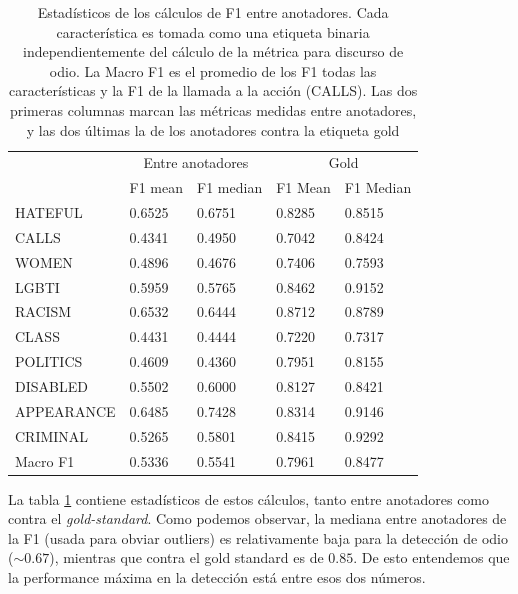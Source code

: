 \begin{table}
    \centering
    \begin{tabular}{lll|ll}
        \hline
                   & \multicolumn{2}{c}{Entre anotadores} & \multicolumn{2}{c}{Gold} \\
        {}         &  F1 mean&  F1 median  & F1 Mean  &  F1 Median \\
        \hline
        HATEFUL    &  0.6525 &   0.6751    & 0.8285   &   0.8515   \\
        \hline
        CALLS      &  0.4341 &   0.4950   &  0.7042   &   0.8424  \\
        WOMEN      &  0.4896 &   0.4676   &  0.7406   &   0.7593  \\
        LGBTI      &  0.5959 &   0.5765   &  0.8462   &   0.9152  \\
        RACISM     &  0.6532 &   0.6444   &  0.8712   &   0.8789  \\
        CLASS      &  0.4431 &   0.4444   &  0.7220   &   0.7317  \\
        POLITICS   &  0.4609 &   0.4360   &  0.7951   &   0.8155  \\
        DISABLED   &  0.5502 &   0.6000   &  0.8127   &   0.8421  \\
        APPEARANCE &  0.6485 &   0.7428   &  0.8314   &   0.9146  \\
        CRIMINAL   &  0.5265 &   0.5801   &  0.8415   &   0.9292  \\
        \hline
        Macro F1   &  0.5336 &   0.5541   &  0.7961   &   0.8477  \\
        \bottomrule
    \end{tabular}

    \caption{Estadísticos de los cálculos de F1 entre anotadores. Cada característica es tomada como una etiqueta binaria independientemente del cálculo de la métrica para discurso de odio. La Macro F1 es el promedio de los F1 todas las características y la F1 de la llamada a la acción (CALLS). Las dos primeras columnas marcan las métricas medidas entre anotadores, y las dos últimas la de los anotadores contra la etiqueta gold}
    \label{tab:ia_f1_scores}
\end{table}


La tabla \ref{tab:ia_f1_scores} contiene estadísticos de estos cálculos, tanto entre anotadores como contra el \emph{gold-standard}. Como podemos observar, la mediana entre anotadores de la F1 (usada para obviar outliers) es relativamente baja para la detección de odio ($\sim 0.67$), mientras que contra el gold standard es de $0.85$. De esto entendemos que la performance máxima en la detección está entre esos dos números.

